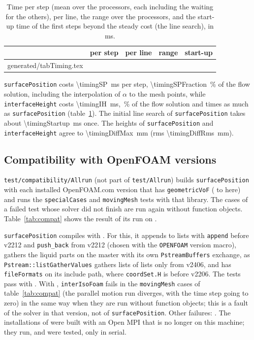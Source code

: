 \documentclass[11pt,a4paper]{article}
\makeatletter
\newcommand{\inputrows}[1]{\@@input #1 }
\newcommand{\sP}{\texttt{surfacePosition}}
\newcommand{\iH}{\texttt{interfaceHeight}}
\makeatother
\begin{document}
\begin{table}[!htbp]
  \centering
  \caption{Time per step (mean over the processors, each including the
    waiting for the others), per line, the range over the processors, and
    the start-up time of the first steps beyond the steady cost (the line
    search), in ms.}
  \label{tab:timing}
  \begin{tabular}{lcccc}
    \toprule
    & per step & per line & range & start-up \\
    \midrule
    \inputrows{generated/tabTiming.tex}
    \bottomrule
  \end{tabular}
\end{table}

\sP{} costs \SI{\timingSP}{ms} per step, \SI{\timingSPFraction}{\%} of the
flow solution, including the interpolation of $\alpha$ to the mesh points,
while \iH{} costs \SI{\timingIH}{ms}, \timingIHFraction{}\,\% of the flow
solution and \timingRatio{} times as much as \sP{}
(table~\ref{tab:timing}). The initial line search of \sP{} takes about
\SI{\timingStartup}{ms} once. The heights of \sP{} and \iH{} agree to
\SI{\timingDiffMax}{mm} (rms \SI{\timingDiffRms}{mm}).

\subsection{Compatibility with OpenFOAM versions}
\label{sec:compat}

\texttt{test/compatibility/Allrun} (not part of \texttt{test/Allrun}) builds
\sP{} with each installed OpenFOAM.com version that has
\texttt{geometricVoF} (\compatOldest{} to \compatNewest{} here) and runs the
\texttt{specialCases} and \texttt{movingMesh} tests with that library. The
cases of a failed test whose solver did not finish are run again without
function objects. Table~\ref{tab:compat} shows the result of its run on
\compatDate.

\sP{} compiles with \compatCompiling. For this, it appends to lists with
\texttt{append} before v2212 and \texttt{push\_back} from v2212 (chosen with
the \texttt{OPENFOAM} version macro), gathers the liquid parts on the master
with its own \texttt{PstreamBuffers} exchange, as
\texttt{Pstream::listGatherValues} gathers lists of lists only from v2406,
and has \texttt{fileFormats} on its include path, where \texttt{coordSet.H}
is before v2206. The tests pass with \compatPassing. With
\compatSolverOnly{}, \texttt{interIsoFoam} fails in the
\texttt{movingMesh} cases of table~\ref{tab:compat} (the parallel motion run
diverges, with the time step going to zero) in the same way when they are
run without function objects; this is a fault of the solver in that version,
not of \sP{}. Other failures: \compatOther. The
installations of \compatSerialOnly{} were built with an Open MPI that is no
longer on this machine; they run, and were tested, only in serial.
\end{document}
